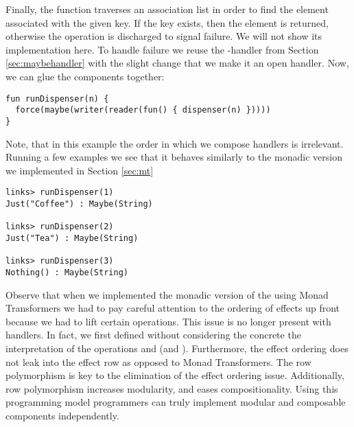 \begin{example}
Finally, the  function traverses an association list in order to find the element associated with the given key. If the key exists, then the element is returned, otherwise the  operation is discharged to signal failure. We will not show its implementation here.
To handle failure we reuse the -handler from Section \ref{sec:maybehandler} with the slight change that we make it an open handler. Now, we can glue the components together:
\begin{lstlisting}[style=links]
fun runDispenser(n) {
  force(maybe(writer(reader(fun() { dispenser(n) }))))
}
\end{lstlisting}
Note, that in this example the order in which we compose handlers is irrelevant.
Running a few examples we see that it behaves similarly to the monadic version we implemented in Section \ref{sec:mt}
\begin{lstlisting}[style=links]
links> runDispenser(1)
Just("Coffee") : Maybe(String)

links> runDispenser(2)
Just("Tea") : Maybe(String)

links> runDispenser(3)
Nothing() : Maybe(String)
\end{lstlisting}
\end{example}
Observe that when we implemented the monadic version of the  using Monad Transformers we had to pay careful attention to the ordering of effects up front because we had to lift certain operations. This issue is no longer present with handlers. In fact, we first defined  without considering the concrete the interpretation of the operations  and  (and ). Furthermore, the effect ordering does not leak into the effect row as opposed to Monad Transformers. The row polymorphism is key to the elimination of the effect ordering issue. Additionally, row polymorphism increases modularity, and eases compositionality. Using this programming model programmers can truly implement modular and composable components independently.

